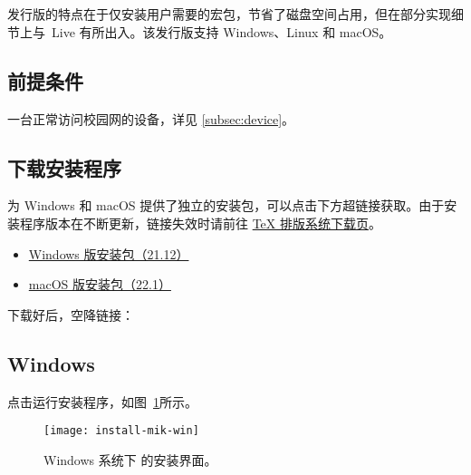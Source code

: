 \section{}
\label{sec:mik}

\begin{widepar}
   发行版的特点在于仅安装用户需要的宏包，节省了磁盘空间占用，但在部分实现细节上与 \,Live 有所出入。该发行版支持 Windows、Linux 和 macOS。
\end{widepar}

\subsection{前提条件}

一台正常访问校园网的设备，详见 \ref{subsec:device}。

\subsection{下载安装程序}

 为 Windows 和 macOS 提供了独立的安装包，可以点击下方超链接获取。由于安装程序版本在不断更新，链接失效时请前往 \href{https://mirrors.nju.edu.cn/download/TeX%20%E6%8E%92%E7%89%88%E7%B3%BB%E7%BB%9F}{TeX 排版系统下载页}。

\begin{itemize}
  \item \href{https://mirrors.nju.edu.cn/CTAN/systems/win32/miktex/setup/windows-x64/basic-miktex-21.12-x64.exe}{\faFile*[regular] Windows 版安装包（21.12）}
  \item \href{https://mirrors.nju.edu.cn/CTAN/systems/win32/miktex/setup/darwin-x86_64/miktex-22.1-darwin-x86_64.dmg}{\faFile*[regular] macOS 版安装包（22.1）}
\end{itemize}

下载好后，空降链接：
\hyperref[subsec:mik-win-mac]{\faWindows{}}\,
\hyperref[subsec:mik-linux]{\faLinux{}}\,
\hyperref[subsec:mik-win-mac]{\faApple{}}

\subsection{Windows}
\label{subsec:mik-win}

点击运行安装程序，如图~\ref{fig:install-mik-win}所示。

\begin{figure}[htbp]
  \caption{Windows 系统下  的安装界面。}
  \label{fig:install-mik-win}
  \texttt{[image: install-mik-win]}
\end{figure}

